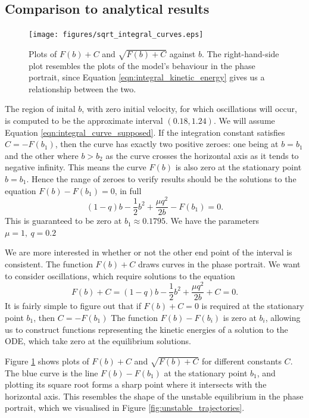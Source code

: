 \documentclass{report}
\begin{document}
\subsection{Comparison to analytical results}

\begin{figure}
    \centering
    \texttt{[image: figures/sqrt\_integral\_curves.eps]}
    \caption{
        Plots of $F(b)+C$ and $\sqrt{F(b)+C}$ against $b$.
        The right-hand-side plot resembles the plots of the model's behaviour in the phase portrait,
        since Equation \ref{eqn:integral_kinetic_energy} gives us a relationship between the two.
    }
    \label{fig:sqrt_curves}
\end{figure}
The region of inital $b$, with zero initial velocity, for which oscillations will occur,
is computed to be the approximate interval $(0.18,1.24)$.
We will assume Equation \ref{eqn:integral_curve_supposed}.
If the integration constant satisfies $C = -F(b_1)$,
then the curve has exactly two positive zeroes:
one being at $b=b_1$ and the other where $b>b_2$ as the curve crosses the horizontal axis as it tends to negative infinity.
This means the curve \(F(b)\) is also zero at the stationary point \(b = b_1\).
Hence the range of zeroes to verify results should be the solutions to the equation $F(b)-F(b_1)=0$, in full
\begin{equation}
    (1-q)b - \frac{1}{2}b^2 + \frac{\mu q^2}{2b} - F(b_1) = 0.
    \label{eqn:integral_curves_zeroes_explicit}
\end{equation}
This is guaranteed to be zero at $b_1 \approx 0.1795$.
We have the parameters \(\mu = 1,~ q = 0.2\)

We are more interested in whether or not the other end point of the interval is consistent.
The function \(F(b) + C\) draws curves in the phase portrait.
We want to consider oscillations, which require solutions to the equation
\begin{equation}
    F(b) + C = (1-q)b - \frac{1}{2}b^2 + \frac{\mu q^2}{2b} + C = 0.
\end{equation}
It is fairly simple to figure out that if \(F(b)+C=0\) is required at the stationary point \(b_1\),
then \(C = -F(b_1)\)
The function \(F(b)-F(b_i)\) is zero at $b_i$, allowing us to construct functions representing the kinetic energies of a solution to the ODE,
which take zero at the equilibrium solutions.

Figure \ref{fig:sqrt_curves} shows plots of $F(b)+C$ and $\sqrt{F(b)+C}$ for different constants $C$.
The blue curve is the line $F(b)-F(b_1)$ at the stationary point $b_1$,
and plotting its square root forms a sharp point where it intersects with the horizontal axis.
This resembles the shape of the unstable equilibrium in the phase portrait,
which we visualised in Figure \ref{fig:unstable_trajectories}.
\end{document}

